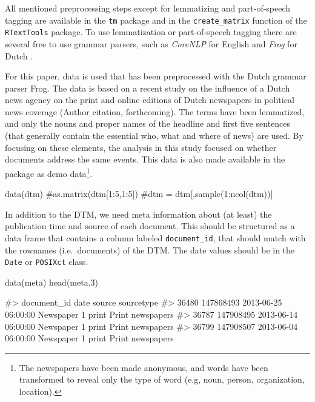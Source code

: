 All mentioned preprocessing steps except for lemmatizing and
part-of-speech tagging are available in the \texttt{tm} package and in
the \texttt{create\_matrix} function of the \texttt{RTextTools} package.
To use lemmatization or part-of-speech tagging there are several free to
use grammar parsers, such as \emph{CoreNLP} for English \citep{corenlp}
and \emph{Frog} for Dutch \citep{bosch07}.

For this paper, data is used that has been preprocessed with the Dutch
grammar parser Frog. The data is based on a recent study on the
influence of a Dutch news agency on the print and online editions of
Dutch newspapers in political news coverage (Author citation,
forthcoming). The terms have been lemmatized, and only the nouns and
proper names of the headline and first five sentences (that generally
contain the essential who, what and where of news) are used. By focusing
on these elements, the analysis in this study focused on whether
documents address the same events. This data is also made available in
the package as demo data\footnote{The newspapers have been made
  anonymous, and words have been transformed to reveal only the type of
  word (e.g, noun, person, organization, location).}.

\begin{Schunk}
\begin{Sinput}
data(dtm)
#as.matrix(dtm[1:5,1:5])
#dtm = dtm[,sample(1:ncol(dtm))]
\end{Sinput}
\end{Schunk}

In addition to the DTM, we need meta information about (at least) the
publication time and source of each document. This should be structured
as a data frame that contains a column labeled \texttt{document\_id},
that should match with the rownames (i.e.~documents) of the DTM. The
date values should be in the \texttt{Date} or \texttt{POSIXct} class.

\begin{Schunk}
\begin{Sinput}
data(meta)
head(meta,3)
\end{Sinput}
\begin{Soutput}
#>       document_id                date            source       sourcetype
#> 36480   147868493 2013-06-25 06:00:00 Newspaper 1 print Print newspapers
#> 36787   147908495 2013-06-14 06:00:00 Newspaper 1 print Print newspapers
#> 36799   147908507 2013-06-04 06:00:00 Newspaper 1 print Print newspapers
\end{Soutput}
\end{Schunk}

